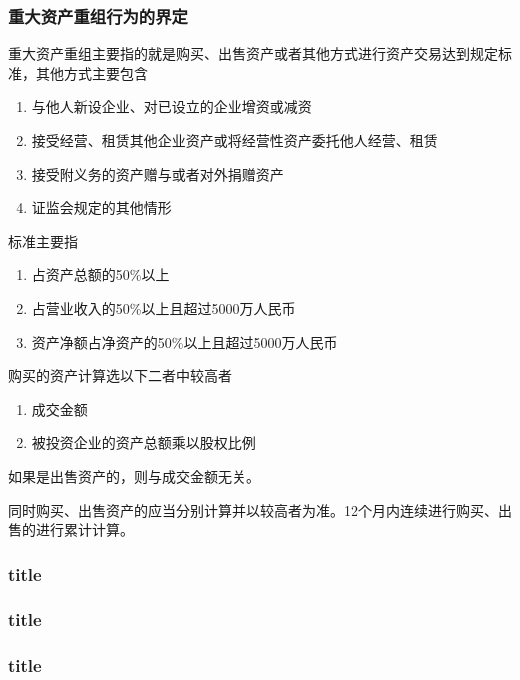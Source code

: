 \documentclass[UTF8,12pt]{ctexart}
\numberwithin{equation}{section} %
\numberwithin{figure}{section}
\numberwithin{table}{section}
\begin{document}
	\subsubsection{重大资产重组行为的界定}
	重大资产重组主要指的就是购买、出售资产或者其他方式进行资产交易达到规定标准，其他方式主要包含
	\begin{enumerate}
		\item 与他人新设企业、对已设立的企业增资或减资
		
		\item 接受经营、租赁其他企业资产或将经营性资产委托他人经营、租赁
		
		\item 接受附义务的资产赠与或者对外捐赠资产
		
		\item 证监会规定的其他情形
	\end{enumerate}
	
	标准主要指
	\begin{enumerate}
		\item 占资产总额的50\%以上
		
		\item 占营业收入的50\%以上且超过5000万人民币
		
		\item 资产净额占净资产的50\%以上且超过5000万人民币
	\end{enumerate}
	
	购买的资产计算选以下二者中较高者
	\begin{enumerate}
		\item 成交金额
		
		\item 被投资企业的资产总额乘以股权比例
	\end{enumerate}
	如果是出售资产的，则与成交金额无关。
	
	同时购买、出售资产的应当分别计算并以较高者为准。12个月内连续进行购买、出售的进行累计计算。
	
	\subsubsection{title}
	
	\subsubsection{title}
	
	\subsubsection{title}
	
\end{document}
